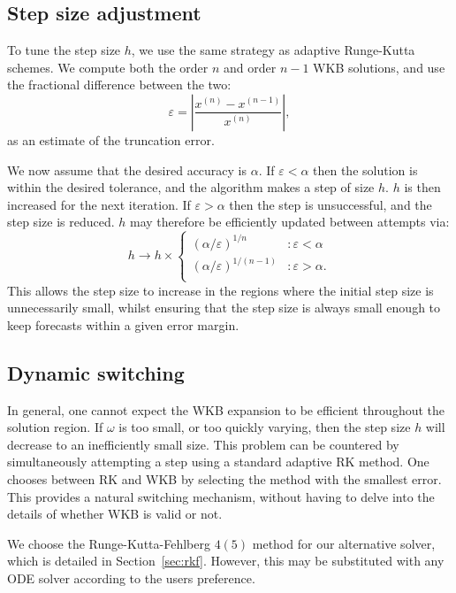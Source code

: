 \subsection{Step size adjustment}
To tune the step size $h$, we use the same strategy as adaptive Runge-Kutta schemes. We compute both the order $n$ and order $n-1$ WKB solutions, and use the fractional difference between the two:
\begin{equation}
  \varepsilon = \left|\frac{x^{(n)}-x^{(n-1)}}{x^{(n)}}\right|,
  \nonumber
\end{equation}
as an estimate of the truncation error. 

We now assume that the desired accuracy is $\alpha$. If $\varepsilon<\alpha$ then the solution is within the desired tolerance, and the algorithm makes a step of size $h$. $h$ is then increased for the next iteration. If $\varepsilon>\alpha$ then the step is unsuccessful, and the step size is reduced. $h$ may therefore be efficiently updated between attempts via:
\begin{equation}
  h \to h\times\left\{
  \begin{array}{lr}
    {(\alpha/\varepsilon)}^{1/n} &: \varepsilon<\alpha \\
    {(\alpha/\varepsilon)}^{1/(n-1)} &: \varepsilon>\alpha. \\
  \end{array}
  \right.\label{eqn:h_update}
\end{equation}
This allows the step size to increase in the regions where the initial step size is unnecessarily small, whilst ensuring that the step size is always small enough to keep forecasts within a given error margin.

\subsection{Dynamic switching}
In general, one cannot expect the WKB expansion to be efficient throughout the solution region. If $\omega$ is too small, or too quickly varying, then the step size $h$ will decrease to an inefficiently small size. This problem can be countered by simultaneously attempting a step using a standard adaptive RK method. One chooses between RK and WKB by selecting the method with the smallest error. This provides a natural switching mechanism, without having to delve into the details of whether WKB is valid or not.

We choose the Runge-Kutta-Fehlberg $4(5)$ method for our alternative solver, which is detailed in Section~\ref{sec:rkf}. However, this may be substituted with any ODE solver according to the users preference.

